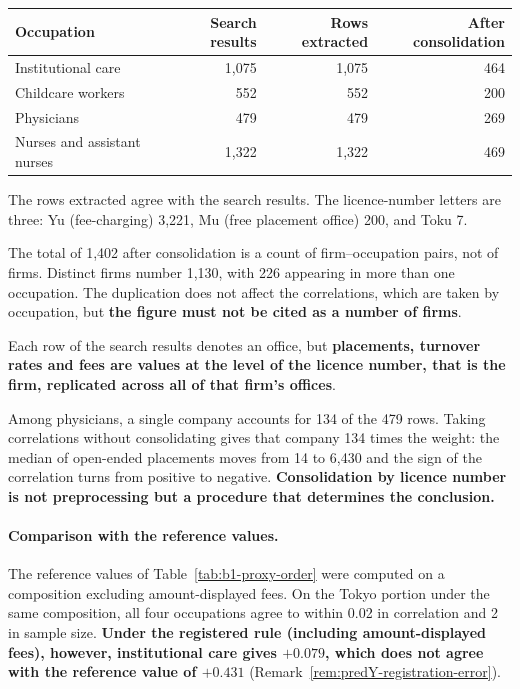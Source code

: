 \begin{center}
\begin{tabular}{@{}lrrr@{}}
\toprule
Occupation & Search results & Rows extracted & After consolidation \\
\midrule
Institutional care & 1,075 & 1,075 & 464 \\
Childcare workers & 552 & 552 & 200 \\
Physicians & 479 & 479 & 269 \\
Nurses and assistant nurses & 1,322 & 1,322 & 469 \\
\bottomrule
\end{tabular}
\label{tab:predY-sample}
\end{center}

The rows extracted agree with the search results. The licence-number letters are three: Yu
(fee-charging) 3,221, Mu (free placement office) 200, and Toku 7.

The total of 1,402 after consolidation is a count of firm--occupation pairs, not of firms. Distinct
firms number 1,130, with 226 appearing in more than one occupation. The duplication does not
affect the correlations, which are taken by occupation, but \textbf{the figure must not be cited
as a number of firms}.

\begin{remark}
\label{rem:jinzai-dedup}
Each row of the search results denotes an office, but \textbf{placements, turnover rates and fees
are values at the level of the licence number, that is the firm, replicated across all of that
firm's offices}.

Among physicians, a single company accounts for 134 of the 479 rows. Taking correlations without
consolidating gives that company 134 times the weight: the median of open-ended placements moves
from 14 to 6,430 and the sign of the correlation turns from positive to negative.
\textbf{Consolidation by licence number is not preprocessing but a procedure that determines the
conclusion.}
\end{remark}

\paragraph{Comparison with the reference values.}
The reference values of Table~\ref{tab:b1-proxy-order} were computed on a composition excluding
amount-displayed fees. On the Tokyo portion under the same composition, all four occupations agree
to within 0.02 in correlation and 2 in sample size. \textbf{Under the registered rule (including
amount-displayed fees), however, institutional care gives $+0.079$, which does not agree with the
reference value of $+0.431$} (Remark~\ref{rem:predY-registration-error}).

